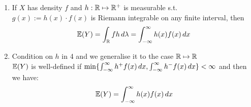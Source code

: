 \begin{thm}
\begin{enumerate}
    \item If $X$ has density $f$ and $h: \mathbb{R} \mapsto \mathbb{R}^+$ is measurable s.t. $g(x):= h(x)\cdot f(x)$ is Riemann integrable on any finite interval, then 
    \begin{equation*}
        \mathbb{E}(Y) = \int_{\mathbb{R}} fh \mathop{}\!d\lambda = \int_{-\infty}^{\infty} h(x)f(x) \mathop{}\!d x
    \end{equation*}
    \item Condition on $h$ in 4 and we generalise it to the case $\mathbb{R} \mapsto \mathbb{R}$ \\
    $\mathbb{E}(Y)$ is well-defined if $\min\{\int_{-\infty}^{\infty} h^+f(x) \mathop{}\!d x, \int_{-\infty}^{\infty} h^-f(x) \mathop{}\!d x\}<\infty$ and then we have:
    \begin{equation*}
        \mathbb{E}(Y) = \int_{-\infty}^{\infty} h(x)f(x) \mathop{}\!d x
    \end{equation*}
\end{enumerate}
\end{thm}
\pf 

